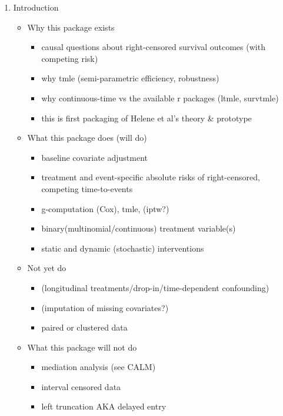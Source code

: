 \documentclass{report}
\newcommand{\1}{\ensuremath{\mathbf{1}}}
\begin{document}
\begin{enumerate}
\item Introduction
\begin{itemize}
\item Why this package exists
\begin{itemize}
\item causal questions about right-censored survival outcomes (with competing risk)
\item why tmle (semi-parametric efficiency, robustness)
\item why continuous-time vs the available r packages (ltmle, survtmle)
\item this is first packaging of Helene et al's theory \& prototype
\end{itemize}

\item What this package does (will do)
\begin{itemize}
\item baseline covariate adjustment
\item treatment and event-specific absolute risks of right-censored, competing time-to-events
\item g-computation (Cox), tmle, (iptw?)
\item binary(multinomial/continuous) treatment variable(s)
\item static and dynamic (stochastic) interventions
\end{itemize}

\item Not yet do
\begin{itemize}
\item (longitudinal treatments/drop-in/time-dependent confounding)
\item (imputation of missing covariates?)
\item paired or clustered data
\end{itemize}

\item What this package will not do
\begin{itemize}
\item mediation analysis (see CALM)
\item interval censored data
\item left truncation AKA delayed entry
\end{itemize}
\end{itemize}


\end{enumerate}
\end{document}
